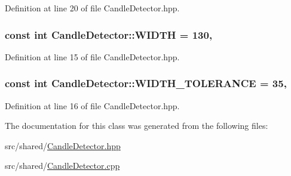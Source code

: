 Definition at line 20 of file Candle\-Detector.\-hpp.

\hypertarget{classCandleDetector_af4c5d2170cea56fa4263639f20ed13ed}{
\subsubsection[{W\-I\-D\-T\-H}]{\setlength{\rightskip}{0pt plus 5cm}const int Candle\-Detector\-::\-W\-I\-D\-T\-H = 130\hspace{0.3cm}{\ttfamily [static]}, {\ttfamily [private]}}}\label{classCandleDetector_af4c5d2170cea56fa4263639f20ed13ed}


Definition at line 15 of file Candle\-Detector.\-hpp.

\hypertarget{classCandleDetector_a1c8f0232491ba37dd10032c1da376145}{
\subsubsection[{W\-I\-D\-T\-H\-\_\-\-T\-O\-L\-E\-R\-A\-N\-C\-E}]{\setlength{\rightskip}{0pt plus 5cm}const int Candle\-Detector\-::\-W\-I\-D\-T\-H\-\_\-\-T\-O\-L\-E\-R\-A\-N\-C\-E = 35\hspace{0.3cm}{\ttfamily [static]}, {\ttfamily [private]}}}\label{classCandleDetector_a1c8f0232491ba37dd10032c1da376145}


Definition at line 16 of file Candle\-Detector.\-hpp.



The documentation for this class was generated from the following files\-:\begin{DoxyCompactItemize}
\item 
src/shared/\hyperlink{CandleDetector_8hpp}{Candle\-Detector.\-hpp}\item 
src/shared/\hyperlink{CandleDetector_8cpp}{Candle\-Detector.\-cpp}\end{DoxyCompactItemize}
